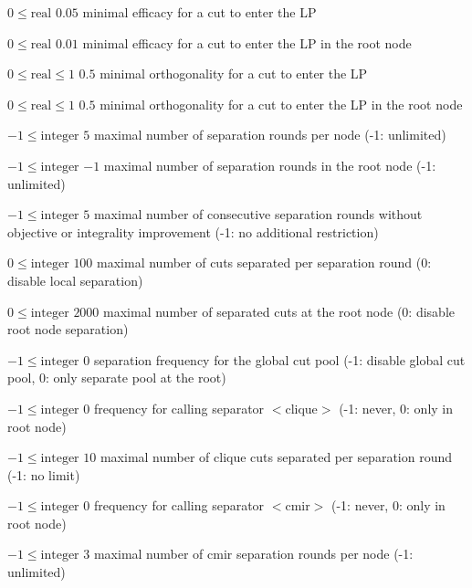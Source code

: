 %
{$0\leq\textrm{real}$}%
{$0.05$}%
{minimal efficacy for a cut to enter the LP}%
{}

%
{$0\leq\textrm{real}$}%
{$0.01$}%
{minimal efficacy for a cut to enter the LP in the root node}%
{}

%
{$0\leq\textrm{real}\leq1$}%
{$0.5$}%
{minimal orthogonality for a cut to enter the LP}%
{}

%
{$0\leq\textrm{real}\leq1$}%
{$0.5$}%
{minimal orthogonality for a cut to enter the LP in the root node}%
{}

%
{$-1\leq\textrm{integer}$}%
{$5$}%
{maximal number of separation rounds per node (-1: unlimited)}%
{}

%
{$-1\leq\textrm{integer}$}%
{$-1$}%
{maximal number of separation rounds in the root node (-1: unlimited)}%
{}

%
{$-1\leq\textrm{integer}$}%
{$5$}%
{maximal number of consecutive separation rounds without objective or integrality improvement (-1: no additional restriction)}%
{}

%
{$0\leq\textrm{integer}$}%
{$100$}%
{maximal number of cuts separated per separation round (0: disable local separation)}%
{}

%
{$0\leq\textrm{integer}$}%
{$2000$}%
{maximal number of separated cuts at the root node (0: disable root node separation)}%
{}

%
{$-1\leq\textrm{integer}$}%
{$0$}%
{separation frequency for the global cut pool (-1: disable global cut pool, 0: only separate pool at the root)}%
{}

%
{$-1\leq\textrm{integer}$}%
{$0$}%
{frequency for calling separator $<$clique$>$ (-1: never, 0: only in root node)}%
{}

%
{$-1\leq\textrm{integer}$}%
{$10$}%
{maximal number of clique cuts separated per separation round (-1: no limit)}%
{}

%
{$-1\leq\textrm{integer}$}%
{$0$}%
{frequency for calling separator $<$cmir$>$ (-1: never, 0: only in root node)}%
{}

%
{$-1\leq\textrm{integer}$}%
{$3$}%
{maximal number of cmir separation rounds per node (-1: unlimited)}%
{}

